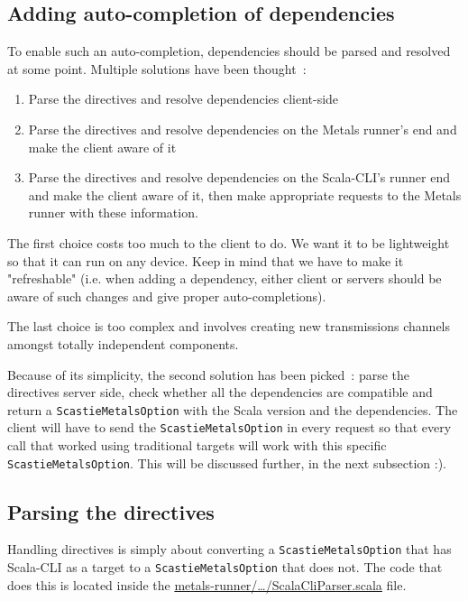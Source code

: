 \documentclass{article}
\begin{document}
\subsection{Adding auto-completion of dependencies}

To enable such an auto-completion, dependencies should be parsed and resolved at some point. Multiple solutions have been thought~:

\begin{enumerate}
    \item Parse the directives and resolve dependencies client-side
    \item Parse the directives and resolve dependencies on the Metals runner's end and make the client aware of it
    \item Parse the directives and resolve dependencies on the Scala-CLI's runner end and make the client aware of it, then make appropriate requests to the Metals runner with these information.
\end{enumerate}

The first choice costs too much to the client to do. We want it to be lightweight so that it can run on any device. Keep in mind that we have to make it "refreshable" (i.e. when adding a dependency, either client or servers should be aware of such changes and give proper auto-completions).

The last choice is too complex and involves creating new transmissions channels amongst totally independent components.

Because of its simplicity, the second solution has been picked~: parse the directives server side, check whether all the dependencies are compatible and return a \lstinline{ScastieMetalsOption} with the Scala version and the dependencies. The client will have to send the \lstinline{ScastieMetalsOption} in every request so that every call that worked using traditional targets will work with this specific \lstinline{ScastieMetalsOption}. This will be discussed further, in the next subsection :).

\subsection{Parsing the directives}

Handling directives is simply about converting a \lstinline{ScastieMetalsOption} that has Scala-CLI as a target to a \lstinline{ScastieMetalsOption} that does not. The code that does this is located inside the \href{https://github.com/Maeeen/scastie/blob/main/metals-runner/src/main/scala/scastie/metals/ScalaCliParser.scala#LL47C14-L47C14}{metals-runner/\ldots/ScalaCliParser.scala} file.
\end{document}
